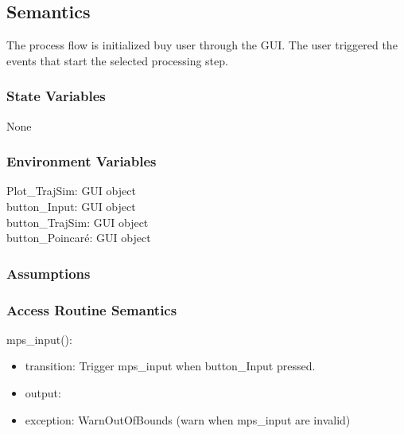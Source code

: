 \documentclass[12pt, titlepage]{article}
\begin{document}
\subsection{Semantics}

The \progname process flow is initialized buy user through the GUI. 
The user triggered the events that start the selected processing step.

\subsubsection{State Variables}

None

\subsubsection{Environment Variables}

\noindent Plot{\_}TrajSim: GUI object\\
button{\_}Input: GUI object\\
button{\_}TrajSim: GUI object\\
button{\_}Poincar\'{e}: GUI object\\



\subsubsection{Assumptions}


\subsubsection{Access Routine Semantics}

\noindent mps\_input():
\begin{itemize}
\item transition: Trigger mps\_input when button\_Input pressed.
\item output:  
\item exception: WarnOutOfBounds (warn when mps\_input are invalid) 
\end{itemize}
\end{document}
